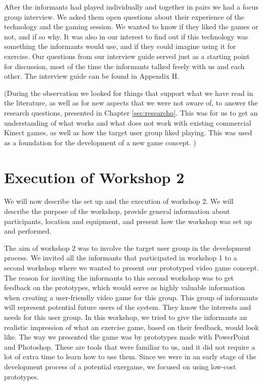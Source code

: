 After the informants had played individually and together in pairs we had a focus group interview. We asked them open questions about their experience of the technology and the gaming session. We wanted to know if they liked the games or not, and if so why. It was also in our interest to find out if this technology was something the informants would use, and if they could imagine using it for exercise. Our questions from our interview guide served just as a starting point for discussion, most of the time the informants talked freely with us and each other. The interview guide can be found in Appendix H.                 

(During the observation we looked for things that support what we have read in the literature, as well as for new aspects that we were not aware of, to answer the research questions, presented in Chapter \ref{sec:researchq}. This was for us to get an understanding of what works and what does not work with existing commercial Kinect games, as well as how the target user group liked playing. This was used as a foundation for the development of a new game concept. )

\section{Execution of Workshop 2}
\label{sec:ws2}
We will now describe the set up and the execution of workshop 2. We will describe the purpose of the workshop, provide general information about participants, location and equipment, and present how the workshop was set up and performed. 

The aim of workshop 2 was to involve the target user group in the development process. We invited all the informants that participated in workshop 1 to a second workshop where we wanted to present our prototyped video game concept. The reason for inviting the informants to this second workshop was to get feedback on the prototypes, which would serve as highly valuable information when creating a user-friendly video game for this group. This group of informants will represent potential future users of the system. They know the interests and needs for this user group. In this workshop, we tried to give the informants an realistic impression of what an exercise game, based on their feedback, would look like. The way we presented the game was by prototypes made with PowerPoint and Photoshop. These are tools that were familiar to us, and it did not require a lot of extra time to learn how to use them. Since we were in an early stage of the development process of a potential exergame, we focused on using low-cost prototypes.  

